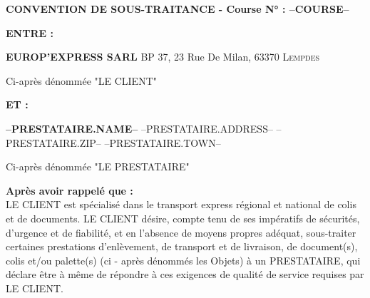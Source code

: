 \newcommand{\FOOT}{--FOOT--}

\begin{center}
\large \bf CONVENTION DE SOUS-TRAITANCE - Course N° : --COURSE--
\end{center}

\begin{fminipage}
\begin{minipage}[t]{0.10\textwidth}
\textbf{ENTRE :} 
\end{minipage}
\hspace{2mm}
\begin{minipage}[t]{0.88\textwidth}
\textbf{EUROP'EXPRESS SARL} \hspace{0.5cm} BP 37, 23 Rue De Milan, \textsc{63370 Lempdes}
\vspace{-10px}
\begin{flushright}
{\small Ci-après dénommée "LE CLIENT"}
\end{flushright}
\end{minipage}

\begin{minipage}[t]{0.10\textwidth}\textbf 
\textbf{ET :} 
\end{minipage}
\hspace{2mm}
\begin{minipage}[t]{0.89\textwidth}
\textbf{--PRESTATAIRE.NAME--} \hspace{0.5cm} --PRESTATAIRE.ADDRESS-- \textsc{--PRESTATAIRE.ZIP-- --PRESTATAIRE.TOWN--}
\vspace{-10px}
\begin{flushright}
{\small Ci-après dénommée "LE PRESTATAIRE"}
\end{flushright}
\end{minipage}
\end{fminipage}

\textbf {Après avoir rappelé que :}\\
LE CLIENT  est spécialisé dans le transport express régional et national de colis et de documents. LE CLIENT désire, compte tenu de ses  impératifs de sécurités, d'urgence et de fiabilité, et en l'absence de moyens propres adéquat, sous-traiter certaines prestations d'enlèvement, de transport et de livraison, de document(s), colis et/ou palette(s) (ci - après dénommés les Objets) à un PRESTATAIRE, qui déclare être à même de répondre à ces exigences de qualité de service requises par LE CLIENT.

